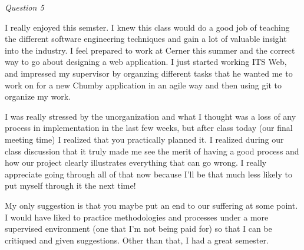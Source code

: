 \documentclass[11pt]{article}
\newcommand{\tab}{\hspace*{2em}}
\begin{document}
\begin{doublespace}
\emph{Question 5}

\tab I really enjoyed this semster. I knew this class would do a good job of teaching the different software engineering techniques and gain a lot of valuable insight into the industry. I feel prepared to work at Cerner this summer and the correct way to go about designing a web application. I just started working ITS Web, and impressed my supervisor by organzing different tasks that he wanted me to work on for a new Chumby application in an agile way and then using git to organize my work. 

\tab I was really stressed by the unorganization and what I thought was a loss of any process in implementation in the last few weeks, but after class today (our final meeting time) I realized that you practically planned it. I realized during our class discussion that it truly made me see the merit of having a good process and how our project clearly illustrates everything that can go wrong. I really appreciate going through all of that now because I'll be that much less likely to put myself through it the next time!

\tab My only suggestion is that you maybe put an end to our suffering at some point. I would have liked to practice methodologies and processes under a more supervised environment (one that I'm not being paid for) so that I can be critiqued and given suggestions. Other than that, I had a great semester.


\end{doublespace}
\end{document}
